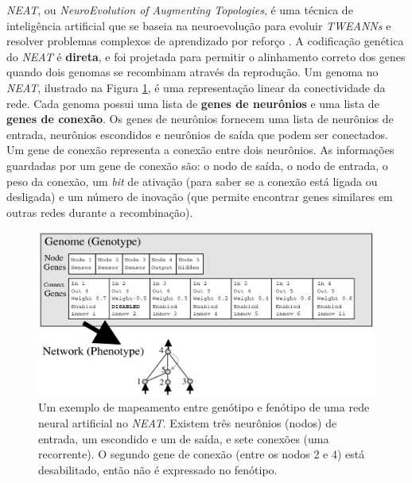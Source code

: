\textit{NEAT}, ou \textit{NeuroEvolution of Augmenting Topologies}, é uma
técnica de inteligência artificial que se baseia na neuroevolução para evoluir
\textit{TWEANNs} e resolver problemas complexos de aprendizado por reforço
\cite{stanley:ec02}. A codificação genética do \textit{NEAT} é \textbf{direta},
e foi projetada para permitir o alinhamento correto dos genes quando dois
genomas se recombinam através da reprodução. Um genoma no \textit{NEAT},
ilustrado na Figura \ref{fig:neat-encoding-example}, é uma representação linear
da conectividade da rede. Cada genoma possui uma lista de \textbf{genes de
neurônios} e uma lista de \textbf{genes de conexão}. Os genes de neurônios
fornecem uma lista de neurônios de entrada, neurônios escondidos e neurônios de
saída que podem ser conectados.  Um gene de conexão representa a conexão entre
dois neurônios. As informações guardadas por um gene de conexão são: o nodo de
saída, o nodo de entrada, o peso da conexão, um \textit{bit} de ativação (para
saber se a conexão está ligada ou desligada) e um número de inovação (que
permite encontrar genes similares em outras redes durante a recombinação). 

\begin{figure}[H]
\centering
\includegraphics[width=\textwidth]{fig/neat-encoding-example.png}
\caption{Um exemplo de mapeamento entre genótipo e fenótipo de uma rede neural
artificial no \textit{NEAT}. Existem três neurônios (nodos) de entrada, um
escondido e um de saída, e sete conexões (uma recorrente). O segundo gene de
conexão (entre os nodos 2 e 4) está desabilitado, então não é expressado no
fenótipo.}
\label{fig:neat-encoding-example}
\end{figure}



